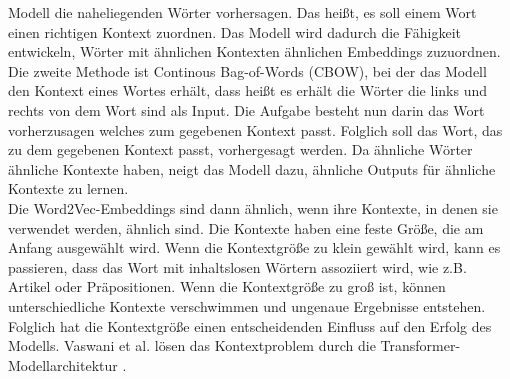 \documentclass[12pt,letterpaper,ngerman]{article}
\begin{document}
Modell die naheliegenden Wörter vorhersagen. Das heißt, es soll einem
Wort einen richtigen Kontext zuordnen. Das Modell wird dadurch die
Fähigkeit entwickeln, Wörter mit ähnlichen Kontexten ähnlichen 
Embeddings zuzuordnen.\\
Die zweite Methode ist Continous Bag-of-Words (CBOW),
bei der das Modell den Kontext eines Wortes erhält,
dass heißt es erhält die Wörter die links und rechts von dem Wort
sind als Input. Die Aufgabe besteht nun darin das Wort vorherzusagen
welches zum gegebenen Kontext passt.
Folglich soll das Wort, das zu dem gegebenen Kontext passt,
vorhergesagt werden.
Da ähnliche Wörter ähnliche Kontexte haben, neigt das Modell dazu,
ähnliche Outputs für ähnliche Kontexte zu lernen.\\
Die Word2Vec-Embeddings sind dann ähnlich, wenn ihre Kontexte,
in denen sie verwendet werden, ähnlich sind.  
Die Kontexte haben eine feste Größe, die am Anfang ausgewählt wird.
Wenn die Kontextgröße zu klein gewählt wird, kann es passieren, dass 
das Wort mit inhaltslosen Wörtern assoziiert wird, wie z.B. Artikel 
oder Präpositionen. Wenn die Kontextgröße zu groß ist, können 
unterschiedliche Kontexte verschwimmen und ungenaue Ergebnisse entstehen.
Folglich hat die Kontextgröße einen entscheidenden Einfluss auf den Erfolg 
des Modells. Vaswani et al. lösen das Kontextproblem 
durch die Transformer-Modellarchitektur \cite{transformer}.

\pagebreak
\end{document}
